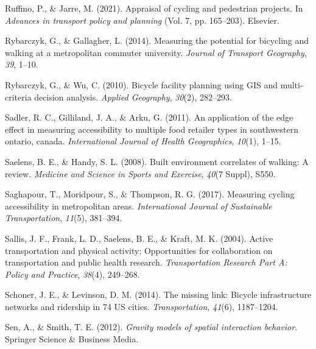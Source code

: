 \documentclass[
11pt, %
oneside, %
english, %
singlespacing, %
]{macthesis} %
\newlength{\cslhangindent}
\newenvironment{CSLReferences}[2] %
 {%
  \setlength{\parindent}{0pt}
  \ifodd #1 \everypar{\setlength{\hangindent}{\cslhangindent}}\ignorespaces\fi
  \ifnum #2 > 0
  \setlength{\parskip}{#2\baselineskip}
  \fi
 }%
 {}
\begin{document}
\begin{CSLReferences}{1}{0}
\leavevmode{}%
Ruffino, P., \& Jarre, M. (2021). Appraisal of cycling and pedestrian projects. In \emph{Advances in transport policy and planning} (Vol. 7, pp. 165--203). Elsevier.

\leavevmode{}%
Rybarczyk, G., \& Gallagher, L. (2014). Measuring the potential for bicycling and walking at a metropolitan commuter university. \emph{Journal of Transport Geography}, \emph{39}, 1--10.

\leavevmode{}%
Rybarczyk, G., \& Wu, C. (2010). Bicycle facility planning using GIS and multi-criteria decision analysis. \emph{Applied Geography}, \emph{30}(2), 282--293.

\leavevmode{}%
Sadler, R. C., Gilliland, J. A., \& Arku, G. (2011). An application of the edge effect in measuring accessibility to multiple food retailer types in southwestern ontario, canada. \emph{International Journal of Health Geographics}, \emph{10}(1), 1--15.

\leavevmode{}%
Saelens, B. E., \& Handy, S. L. (2008). Built environment correlates of walking: A review. \emph{Medicine and Science in Sports and Exercise}, \emph{40}(7 Suppl), S550.

\leavevmode{}%
Saghapour, T., Moridpour, S., \& Thompson, R. G. (2017). Measuring cycling accessibility in metropolitan areas. \emph{International Journal of Sustainable Transportation}, \emph{11}(5), 381--394.

\leavevmode{}%
Sallis, J. F., Frank, L. D., Saelens, B. E., \& Kraft, M. K. (2004). Active transportation and physical activity: Opportunities for collaboration on transportation and public health research. \emph{Transportation Research Part A: Policy and Practice}, \emph{38}(4), 249--268.

\leavevmode{}%
Schoner, J. E., \& Levinson, D. M. (2014). The missing link: Bicycle infrastructure networks and ridership in 74 US cities. \emph{Transportation}, \emph{41}(6), 1187--1204.

\leavevmode{}%
Sen, A., \& Smith, T. E. (2012). \emph{Gravity models of spatial interaction behavior}. Springer Science \& Business Media.


\end{CSLReferences}
\end{document}
